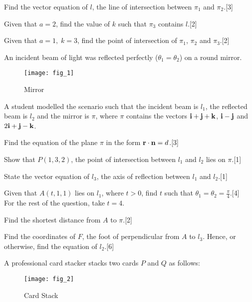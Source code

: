 \documentclass[12pt, a4 paper]{article}
\begin{document}
\begin{outline}[enumerate]
	\2 Find the vector equation of $l$, the line of intersection between ${\pi _1}$ and ${\pi _2}$.\hfill[3]
					
	\2 Given that $a = 2$, find the value of $k$ such that ${\pi _3}$ contains $l$.\hfill[2]
						
	\2 Given that $a = 1,\;k = 3$, find the point of intersection of ${\pi _1}$, ${\pi _2}$ and ${\pi _3}$.\hfill[2]\\
		
	\newpage
		
	\1 An incident beam of light was reflected perfectly (${\theta _1} = {\theta _2}$) on a round mirror.
											        
	\begin{figure}[h]
		\centering
		\texttt{[image: fig\_1]}
		\caption{Mirror}
	\end{figure}
											        
	A student modelled the scenario such that the incident beam is ${l_1}$, the reflected beam is ${l_2}$ and the mirror is $\pi $, where $\pi $ contains the vectors ${\bf{i}} + {\bf{j}} + {\bf{k}}$, ${\bf{i}} - {\bf{j}}$ and $2{\bf{i}} + {\bf{j}} - {\bf{k}}$.
											        
	\2 Find the equation of the plane $\pi $ in the form ${\bf{r}} \cdot {\bf{n}} = d$.\hfill[3]
						
	\2	Show that $P(1,3,2)$, the point of intersection between ${l_1}$ and ${l_2}$ lies on $\pi $.\hfill[1]
					
	\2	State the vector equation of ${l_3}$, the axis of reflection between ${l_1}$ and ${l_2}$.\hfill[1]	
					
	\2	Given that $A(t,1,1)$ lies on ${l_1}$, where $t > 0$, find $t$ such that ${\theta _1} = {\theta _2} = \frac{\pi }{4}$.\hfill[4]	\\
				
	For the rest of the question, take $t = 4$.
	    	
	\2	Find the shortest distance from $A$ to $\pi $.\hfill[2]
	
	\2	Find the coordinates of $F$, the foot of perpendicular from $A$ to ${l_3}$. Hence, or otherwise, find the equation of ${l_2}$.\hfill[6]\\
	
	\newpage
	    
	\1 A professional card stacker stacks two cards $P$ and $Q$ as follows:
	\begin{figure}[h]
		\centering
		\texttt{[image: fig\_2]}
		\caption{Card Stack}
	\end{figure}
											        

\end{outline}
\end{document}
